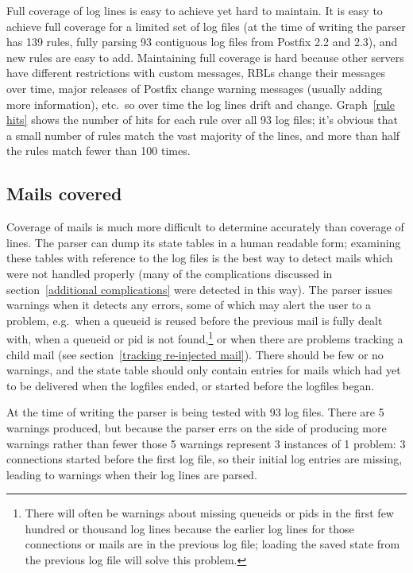 \documentclass[a4paper,12pt,draft]{article}
\begin{document}
Full coverage of log lines is easy to achieve yet hard to maintain.  It is
easy to achieve full coverage for a limited set of log files (at the time
of writing the parser has 139 rules, fully parsing 93 contiguous log files
from Postfix 2.2 and 2.3), and new rules are easy to add.  Maintaining full
coverage is hard because other servers have different restrictions with
custom messages, RBLs change their messages over time, major releases of
Postfix change warning messages (usually adding more information), etc.\ so
over time the log lines drift and change.  Graph~\ref{rule hits} shows the
number of hits for each rule over all 93 log files; it's obvious that a
small number of rules match the vast majority of the lines, and more than
half the rules match fewer than 100 times.

\subsection{Mails covered}

\label{mails-covered}

Coverage of mails is much more difficult to determine accurately than
coverage of lines.  The parser can dump its state tables in a human
readable form; examining these tables with reference to the log files is
the best way to detect mails which were not handled properly (many of the
complications discussed in section~\ref{additional complications} were
detected in this way).  The parser issues warnings when it detects any
errors, some of which may alert the user to a problem, e.g.\ when a queueid
is reused before the previous mail is fully dealt with, when a queueid or
pid is not found,\footnote{There will often be warnings about missing
queueids or pids in the first few hundred or thousand log lines because the
earlier log lines for those connections or mails are in the previous log
file; loading the saved state from the previous log file will solve this
problem.} or when there are problems tracking a child mail (see
section~\ref{tracking re-injected mail}).  There should be few or no
warnings, and the state table should only contain entries for mails which
had yet to be delivered when the logfiles ended, or started before the
logfiles began.

At the time of writing the parser is being tested with 93 log files.  There
are 5 warnings produced, but because the parser errs on the side of
producing more warnings rather than fewer those 5 warnings represent 3
instances of 1 problem: 3 connections started before the first log file, so
their initial log entries are missing, leading to warnings when their log
lines are parsed.
\end{document}
